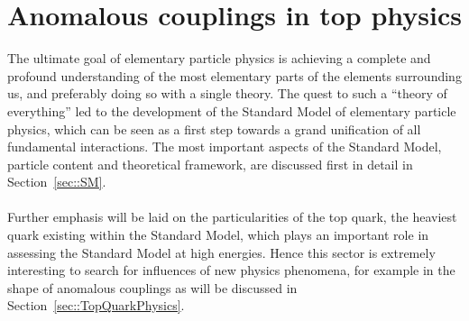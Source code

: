 \chapter{Anomalous couplings in top physics} \label{chp::SM}


The ultimate goal of elementary particle physics is achieving a complete and profound understanding of the most elementary parts of the elements surrounding us, and preferably doing so with a single theory.
The quest to such a ``theory of everything'' led to the development of the Standard Model of elementary particle physics, which can be seen as a first step towards a grand unification of all fundamental interactions. %
The most important aspects of the Standard Model, particle content and theoretical framework, are discussed first in detail in Section~\ref{sec::SM}.
\\
\\
Further emphasis will be laid on the particularities of the top quark, the heaviest quark existing within the Standard Model, which plays an important role in assessing the Standard Model at high energies. 
Hence this sector is extremely interesting to search for influences of new physics phenomena, for example in the shape of anomalous couplings as will be discussed in Section~\ref{sec::TopQuarkPhysics}.

